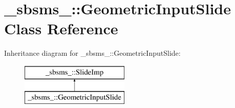 \hypertarget{class__sbsms___1_1_geometric_input_slide}{}\section{\+\_\+sbsms\+\_\+\+:\+:Geometric\+Input\+Slide Class Reference}
\label{class__sbsms___1_1_geometric_input_slide}
Inheritance diagram for \+\_\+sbsms\+\_\+\+:\+:Geometric\+Input\+Slide\+:\begin{figure}[H]
\begin{center}
\leavevmode
\includegraphics[height=2.000000cm]{class__sbsms___1_1_geometric_input_slide}
\end{center}
\end{figure}
